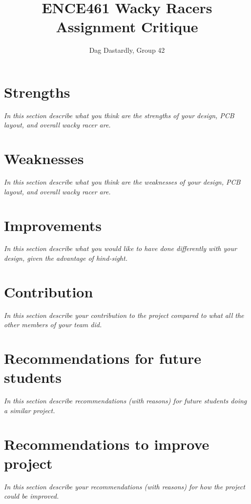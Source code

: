 \documentclass[a4paper,12pt]{article}
\title{ENCE461 Wacky Racers Assignment Critique}
\author{Dag Dastardly, Group 42}
\date{}
\newcommand{\comment}[1]{\emph{\color{blue}#1}}
\begin{document}
\maketitle

\section{Strengths}

\comment{In this section describe what you think are the strengths of
  your design, PCB layout, and overall wacky racer are.}


\section{Weaknesses}

\comment{In this section describe what you think are the weaknesses of
  your design, PCB layout, and overall wacky racer are.}


\section{Improvements}

\comment{In this section describe what you would like to have done
  differently with your design, given the advantage of hind-sight.}


\section{Contribution}

\comment{ In this section describe your contribution to the project
  compared to what all the other members of your team did.}


\section{Recommendations for future students}

\comment{In this section describe recommendations (with reasons) for
  future students doing a similar project.}



\section{Recommendations to improve project}

\comment{In this section describe your recommendations (with reasons) for
  how the project could be improved.}
\end{document}
